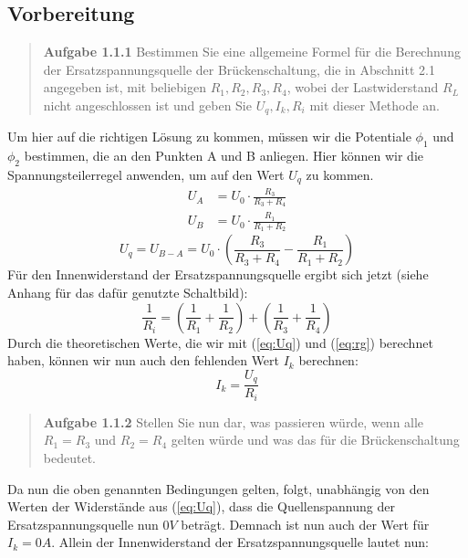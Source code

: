 \documentclass{scrarticle}
\begin{document}
\subsection{Vorbereitung}
\begin{abstract}
  \textbf{Aufgabe 1.1.1} Bestimmen Sie eine allgemeine Formel für die Berechnung der Ersatzspannungsquelle der Brückenschaltung,
  die in Abschnitt 2.1 angegeben ist, mit beliebigen $R_1, R_2, R_3, R_4$, wobei der Lastwiderstand $R_L$ nicht angeschlossen ist
  und geben Sie $U_q, I_k, R_i$ mit dieser Methode an.
\end{abstract}
Um hier auf die richtigen Lösung zu kommen, müssen wir die Potentiale $\phi_1$ und $\phi_2$ bestimmen, die an den Punkten A und B anliegen.
Hier können wir die Spannungsteilerregel anwenden, um auf den Wert $U_q$ zu kommen.
\begin{equation*}
  \begin{aligned}
    U_A &= U_0 \cdot \frac{R_3}{R_3+R_4}\\
    U_B &= U_0 \cdot \frac{R_1}{R_1+R_2}
  \end{aligned}
\end{equation*}
\begin{equation}\label{eq:Uq}
  U_q = U_{B-A} = U_0 \cdot \left(\frac{R_3}{R_3+R_4} - \frac{R_1}{R_1+R_2}\right)
\end{equation}
Für den Innenwiderstand der Ersatzspannungsquelle ergibt sich jetzt (siehe Anhang für das dafür genutzte Schaltbild):
\begin{equation}\label{eq:rg}
  \frac{1}{R_i} = \left(\frac{1}{R_1} + \frac{1}{R_2}\right) + \left(\frac{1}{R_3} + \frac{1}{R_4}\right)
\end{equation}
Durch die theoretischen Werte, die wir mit (\ref{eq:Uq}) und (\ref{eq:rg}) berechnet haben, können wir nun auch den fehlenden Wert $I_k$ berechnen:
\begin{equation}
  \label{eq:Ik}
  I_k = \frac{U_q}{R_i}
\end{equation}
\begin{abstract}
  \textbf{Aufgabe 1.1.2} Stellen Sie nun dar, was passieren würde, wenn alle $R_1 = R_3$ und $R_2 = R_4$
  gelten würde und was das für die Brückenschaltung bedeutet.
\end{abstract}
Da nun die oben genannten Bedingungen gelten, folgt, unabhängig von den Werten der Widerstände aus (\ref{eq:Uq}), dass 
die Quellenspannung der Ersatzspannungsquelle nun $0V$ beträgt. Demnach ist nun auch der Wert für $I_k = 0A$. Allein der Innenwiderstand der 
Ersatzspannungsquelle lautet nun:
\end{document}
